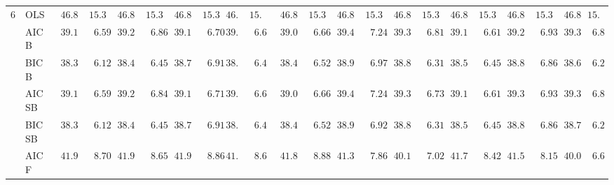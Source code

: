 \begin{tabular}{ll|ll|llllll|llllll|llllll}
6 & OLS  & $\phantom{0}46.80$ & $\phantom{0}15.33$ & $\phantom{0}46.80$ & $\phantom{0}15.33$ & $\phantom{0}46.80$ & $\phantom{0}15.33$ & $46.80$ & $15.33$ & $\phantom{0}46.80$ & $\phantom{0}15.33$ & $\phantom{0}46.80$ & $\phantom{0}15.33$ & $\phantom{0}46.80$ & $\phantom{0}15.33$ & $\phantom{0}46.80$ & $\phantom{0}15.33$ & $\phantom{0}46.80$ & $\phantom{0}15.33$ & $\phantom{0}46.80$ & $15.33$ \\
 & AIC B  & $\phantom{0}39.19$ & $\phantom{00}6.59$ & $\phantom{0}39.21$ & $\phantom{00}6.86$ & $\phantom{0}39.15$ & $\phantom{00}6.70$ & $39.21$ & $\phantom{0}6.64$ & $\phantom{0}39.09$ & $\phantom{00}6.66$ & $\phantom{0}39.42$ & $\phantom{00}7.24$ & $\phantom{0}39.33$ & $\phantom{00}6.81$ & $\phantom{0}39.16$ & $\phantom{00}6.61$ & $\phantom{0}39.27$ & $\phantom{00}6.93$ & $\phantom{0}39.36$ & $\phantom{0}6.81$ \\
 & BIC B  & $\phantom{0}38.31$ & $\phantom{00}6.12$ & $\phantom{0}38.46$ & $\phantom{00}6.45$ & $\phantom{0}38.73$ & $\phantom{00}6.91$ & $38.69$ & $\phantom{0}6.41$ & $\phantom{0}38.48$ & $\phantom{00}6.52$ & $\phantom{0}38.97$ & $\phantom{00}6.97$ & $\phantom{0}38.83$ & $\phantom{00}6.31$ & $\phantom{0}38.54$ & $\phantom{00}6.45$ & $\phantom{0}38.89$ & $\phantom{00}6.86$ & $\phantom{0}38.69$ & $\phantom{0}6.21$ \\
 & AIC SB  & $\phantom{0}39.19$ & $\phantom{00}6.59$ & $\phantom{0}39.21$ & $\phantom{00}6.84$ & $\phantom{0}39.15$ & $\phantom{00}6.71$ & $39.21$ & $\phantom{0}6.64$ & $\phantom{0}39.09$ & $\phantom{00}6.66$ & $\phantom{0}39.42$ & $\phantom{00}7.24$ & $\phantom{0}39.31$ & $\phantom{00}6.73$ & $\phantom{0}39.16$ & $\phantom{00}6.61$ & $\phantom{0}39.30$ & $\phantom{00}6.93$ & $\phantom{0}39.36$ & $\phantom{0}6.81$ \\
 & BIC SB  & $\phantom{0}38.31$ & $\phantom{00}6.12$ & $\phantom{0}38.46$ & $\phantom{00}6.45$ & $\phantom{0}38.73$ & $\phantom{00}6.91$ & $38.69$ & $\phantom{0}6.41$ & $\phantom{0}38.48$ & $\phantom{00}6.52$ & $\phantom{0}38.92$ & $\phantom{00}6.92$ & $\phantom{0}38.83$ & $\phantom{00}6.31$ & $\phantom{0}38.54$ & $\phantom{00}6.45$ & $\phantom{0}38.89$ & $\phantom{00}6.86$ & $\phantom{0}38.70$ & $\phantom{0}6.26$ \\
 & AIC F  & $\phantom{0}41.90$ & $\phantom{00}8.70$ & $\phantom{0}41.97$ & $\phantom{00}8.65$ & $\phantom{0}41.96$ & $\phantom{00}8.86$ & $41.94$ & $\phantom{0}8.66$ & $\phantom{0}41.89$ & $\phantom{00}8.88$ & $\phantom{0}41.36$ & $\phantom{00}7.86$ & $\phantom{0}40.13$ & $\phantom{00}7.02$ & $\phantom{0}41.74$ & $\phantom{00}8.42$ & $\phantom{0}41.50$ & $\phantom{00}8.15$ & $\phantom{0}40.01$ & $\phantom{0}6.65$ \\

\end{tabular}
